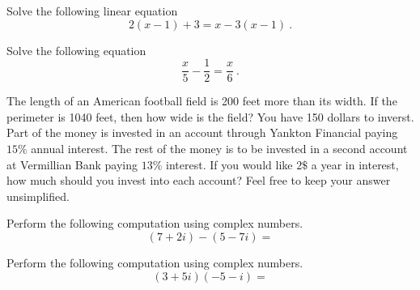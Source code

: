 \documentclass[addpoints,12pt]{exam}
\begin{document}
\begin{center}
\end{center}
\vspace{0.1in}
\vspace{0.2in}




\begin{questions}
	\question Solve the following linear equation 
   \[
 2(x-1)+3 = x-3(x-1)~.
\]

 \begin{solution}

 \end{solution}
 
\question Solve the following equation 
   \[
 \frac{x}{5}- \frac{1}{2} = \frac{x}{6}~.
\]

\question The length of an American football field is 200 feet more than its width. If the perimeter is 1040 feet, then how wide is the field? 
\question You have 150 dollars to inverst. Part of the money is invested in an account through Yankton Financial paying $15\%$ annual interest. The rest of the money is to be invested in a second account at Vermillian Bank paying $13\%$ interest. If you would like $2\$$ a year in interest, how much should you invest into each account? Feel free to keep your answer unsimplified. 

\question Perform the following computation using complex numbers. 
   \[
		 (7+2i)-(5-7i)= 
\]



\question Perform the following computation using complex numbers. 
\[
		 (3+5i)(-5-i)=
\]



\end{questions}
\end{document}
